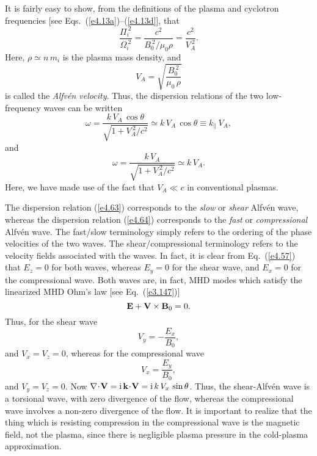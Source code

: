 It is fairly easy to show, from the definitions of the plasma and cyclotron
frequencies [see Eqs.~(\ref{e4.13a})--(\ref{e4.13d}], that
\begin{equation}
\frac{{\Pi}_i^{~2}}{{\Omega}_i^{~2}} = \frac{c^2}{B_0^{~2}/\mu_0\rho}
= \frac{c^2}{V_A^{~2}}.
\end{equation}
Here, $\rho\simeq n\,m_i$ is the plasma mass density, and
\begin{equation}
V_A = \sqrt{\frac{B_0^{~2}}{\mu_0\,\rho}}
\end{equation}
is called the {\em Alfv\'{e}n velocity}. Thus, the dispersion relations
of the two low-frequency waves can be written
\begin{equation}\label{e4.63}
\omega = \frac{k\,V_A\,\cos\theta}{\sqrt{1+V_A^{~2}/c^2}}\simeq k\,V_A\,\cos\theta
\equiv k_\parallel\,V_A,
\end{equation}
and
\begin{equation}\label{e4.64}
\omega = \frac{k\,V_A}{\sqrt{1+V_A^{~2}/c^2}}\simeq k\,V_A.
\end{equation}
Here, we have made use of the fact that $V_A\ll c$ in conventional plasmas. 

The dispersion relation (\ref{e4.63}) corresponds to the {\em slow}\/ or
{\em shear}\/ Alfv\'{e}n wave, whereas the dispersion relation (\ref{e4.64})
corresponds to the {\em fast}\/ or {\em compressional}\/ Alfv\'{e}n wave. 
The fast/slow terminology simply refers to the ordering of  the
phase velocities of  the two waves. The shear/compressional
terminology refers to the velocity fields associated with the waves. In
fact, it is clear from Eq.~(\ref{e4.57}) that $E_z=0$ for both waves, whereas
$E_y=0$ for the shear wave, and $E_x=0$ for the compressional wave. 
Both waves are, in fact,  MHD modes which satisfy the linearized MHD Ohm's law
[see Eq.~(\ref{e3.147})]
\begin{equation}
{\bf E} + {\bf V} \times {\bf B}_0 = 0.
\end{equation}
Thus, for the shear wave
\begin{equation}
V_y = - \frac{E_x}{B_0},
\end{equation}
and $V_x=V_z=0$, whereas for the compressional wave
\begin{equation}
V_x = \frac{E_y}{B_0},
\end{equation}
and $V_y=V_z=0$. Now $\nabla\!\cdot\!{\bf V} =
{\rm i}\,{\bf k}\!\cdot\!{\bf V} = {\rm i}\,k\,V_x\,\sin\theta$.
Thus, the shear-Alfv\'{e}n wave is a torsional  wave, with zero
divergence of the flow, whereas the  compressional wave involves a
non-zero divergence of the flow. It is important to realize that the
thing which is resisting compression  in the compressional wave is the
magnetic field, not the plasma, since there is negligible plasma pressure in
the cold-plasma approximation.

